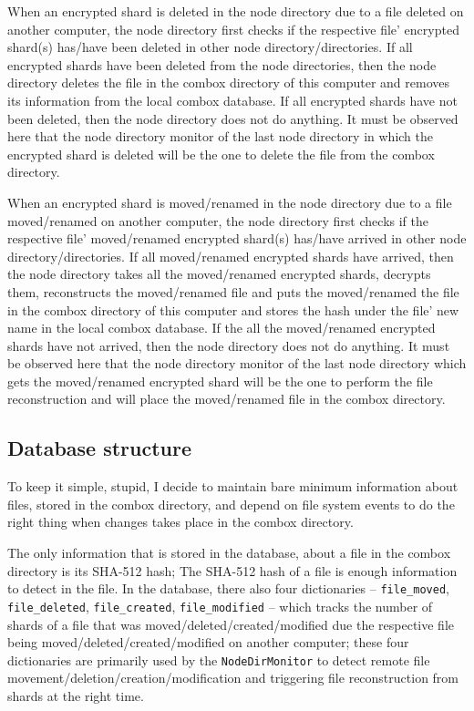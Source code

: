 When an encrypted shard is deleted in the node directory due to a file
deleted on another computer, the node directory first checks if the
respective file' encrypted shard(s) has/have been deleted in other
node directory/directories. If all encrypted shards have been deleted
from the node directories, then the node directory deletes the file in
the combox directory of this computer and removes its information from
the local combox database. If all encrypted shards have not been
deleted, then the node directory does not do anything. It must be
observed here that the node directory monitor of the last node
directory in which the encrypted shard is deleted will be the one to
delete the file from the combox directory.

When an encrypted shard is moved/renamed in the node directory due to
a file moved/renamed on another computer, the node directory first
checks if the respective file' moved/renamed encrypted shard(s)
has/have arrived in other node directory/directories. If all
moved/renamed encrypted shards have arrived, then the node directory
takes all the moved/renamed encrypted shards, decrypts them,
reconstructs the moved/renamed file and puts the moved/renamed the file
in the combox directory of this computer and stores the hash under the
file' new name in the local combox database. If the all the
moved/renamed encrypted shards have not arrived, then the node
directory does not do anything. It must be observed here that the node
directory monitor of the last node directory which gets the
moved/renamed encrypted shard will be the one to perform the file
reconstruction and will place the moved/renamed file in the combox
directory.

\subsection{Database structure}\label{sec:3-combox-db}

To keep it simple, stupid, I decide to maintain bare minimum
information about files, stored in the combox directory, and depend on
file system events to do the right thing when changes takes place in
the combox directory.

The only information that is stored in the database, about a file in
the combox directory is its SHA-512 hash; The SHA-512 hash of a file
is enough information to detect in the file. In the database, there
also four dictionaries -- \verb+file_moved+, \verb+file_deleted+,
\verb+file_created+, \verb+file_modified+ -- which tracks the number
of shards of a file that was moved/deleted/created/modified due the
respective file being moved/deleted/created/modified on another
computer; these four dictionaries are primarily used by the
\verb+NodeDirMonitor+ to detect remote file
movement/deletion/creation/modification and triggering file
reconstruction from shards at the right time.

